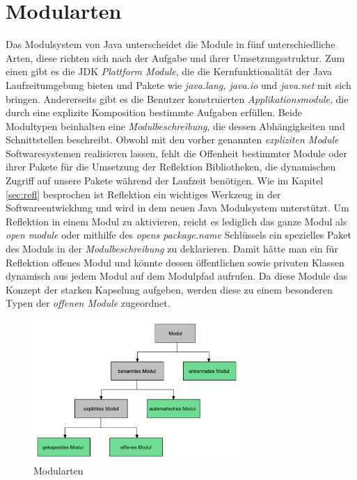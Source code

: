   \section{Modularten} \label{Modularten}
    Das Modulsystem von Java unterscheidet die Module in fünf unterschiedliche Arten, diese richten sich nach der Aufgabe und ihrer Umsetzungsstruktur. Zum einen gibt es die JDK \textit{Plattform Module}, die die Kernfunktionalität der Java Laufzeitumgebung bieten und Pakete wie \textit{java.lang, java.io} und \textit{java.net} mit sich bringen. Andererseits gibt es die Benutzer konstruierten \textit{Applikationsmodule}, die durch eine explizite Komposition bestimmte Aufgaben erfüllen. Beide Modultypen beinhalten eine \textit{Modulbeschreibung}, die dessen Abhängigkeiten und Schnittstellen beschreibt. \newline
    Obwohl mit den vorher genannten \textit{expliziten Module} Softwaresystemen realisieren lassen, fehlt die Offenheit bestimmter Module oder ihrer Pakete für die Umsetzung der Reflektion Bibliotheken, die dynamischen Zugriff auf unsere Pakete während der Laufzeit benötigen. Wie im Kapitel \ref{sec:refl} besprochen ist Reflektion ein wichtiges Werkzeug in der Softwareentwicklung und wird in dem neuen Java Modulsystem unterstützt. Um Reflektion in einem Modul zu aktivieren, reicht es lediglich das ganze Modul als \textit{open module} oder mithilfe des \textit{opens package.name} Schlüssels ein spezielles Paket des Moduls in der \textit{Modulbeschreibung} zu deklarieren. Damit hätte man ein für Reflektion offenes Modul und könnte dessen öffentlichen sowie privaten Klassen dynamisch aus jedem Modul auf dem Modulpfad aufrufen. Da diese Module das Konzept der starken Kapselung aufgeben, werden diese zu einem besonderen Typen der \textit{offenen Module} zugeordnet. \cite{modulMitJava9,java9modRevealed,modulProgJava9,explorJava9}

    \begin{figure}[h]
      \centering
      \includegraphics[width=0.7\textwidth]{material/images/module-tree.pdf}
      \caption{Modularten \cite{modulMitJava9}}
      \label{fig:modtree}
    \end{figure}

